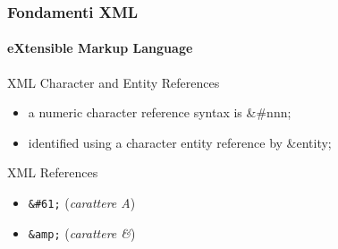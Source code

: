 
\begin{frame}
    \frametitle{Fondamenti XML}
    \framesubtitle{eXtensible Markup Language}
    \addtocounter{nframe}{1}

	\begin{block}{XML Character and Entity References}
		\begin{itemize}
			\item a numeric character reference syntax  is \&\#nnn;
			\item identified using a character entity reference by \&entity;
		\end{itemize}
	\end{block}

	\begin{block}{XML References}
		\begin{itemize}
			\item \texttt{\&\#61;} (\textit{carattere A})
			\item \texttt{\&amp;} (\textit{carattere \&})
		\end{itemize}
	\end{block}

\end{frame}


